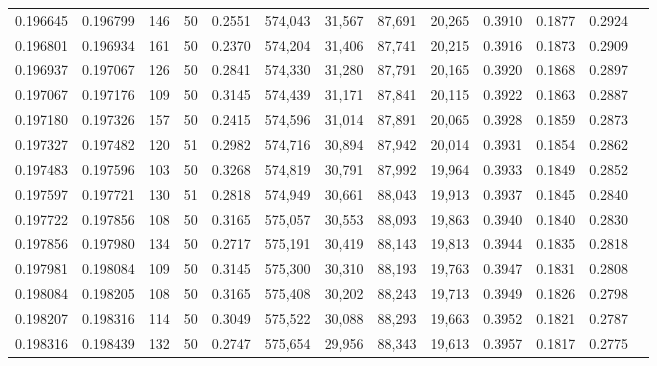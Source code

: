 \begin{tabular}{rrrrrrrrrrrrr}
0.196645 & 0.196799 &   146 &  50 &                                     0.2551 & 574,043 &  31,567 &  87,691 &  20,265 & 0.3910 & 0.1877 & 0.2924 \\
0.196801 & 0.196934 &   161 &  50 &                                     0.2370 & 574,204 &  31,406 &  87,741 &  20,215 & 0.3916 & 0.1873 & 0.2909 \\
0.196937 & 0.197067 &   126 &  50 &                                     0.2841 & 574,330 &  31,280 &  87,791 &  20,165 & 0.3920 & 0.1868 & 0.2897 \\
0.197067 & 0.197176 &   109 &  50 &                                     0.3145 & 574,439 &  31,171 &  87,841 &  20,115 & 0.3922 & 0.1863 & 0.2887 \\
0.197180 & 0.197326 &   157 &  50 &                                     0.2415 & 574,596 &  31,014 &  87,891 &  20,065 & 0.3928 & 0.1859 & 0.2873 \\
0.197327 & 0.197482 &   120 &  51 &                                     0.2982 & 574,716 &  30,894 &  87,942 &  20,014 & 0.3931 & 0.1854 & 0.2862 \\
0.197483 & 0.197596 &   103 &  50 &                                     0.3268 & 574,819 &  30,791 &  87,992 &  19,964 & 0.3933 & 0.1849 & 0.2852 \\
0.197597 & 0.197721 &   130 &  51 &                                     0.2818 & 574,949 &  30,661 &  88,043 &  19,913 & 0.3937 & 0.1845 & 0.2840 \\
0.197722 & 0.197856 &   108 &  50 &                                     0.3165 & 575,057 &  30,553 &  88,093 &  19,863 & 0.3940 & 0.1840 & 0.2830 \\
0.197856 & 0.197980 &   134 &  50 &                                     0.2717 & 575,191 &  30,419 &  88,143 &  19,813 & 0.3944 & 0.1835 & 0.2818 \\
0.197981 & 0.198084 &   109 &  50 &                                     0.3145 & 575,300 &  30,310 &  88,193 &  19,763 & 0.3947 & 0.1831 & 0.2808 \\
0.198084 & 0.198205 &   108 &  50 &                                     0.3165 & 575,408 &  30,202 &  88,243 &  19,713 & 0.3949 & 0.1826 & 0.2798 \\
0.198207 & 0.198316 &   114 &  50 &                                     0.3049 & 575,522 &  30,088 &  88,293 &  19,663 & 0.3952 & 0.1821 & 0.2787 \\
0.198316 & 0.198439 &   132 &  50 &                                     0.2747 & 575,654 &  29,956 &  88,343 &  19,613 & 0.3957 & 0.1817 & 0.2775 \\

\end{tabular}
